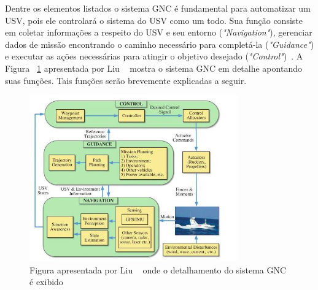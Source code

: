         Dentre os elementos listados o sistema GNC é fundamental para automatizar um USV, pois ele controlará o sistema do USV como um todo. Sua função consiste em coletar informações a respeito do USV e seu entorno (\textit{"Navigation"}), gerenciar dados de missão encontrando o caminho necessário para completá-la (\textit{"Guidance"}) e executar as ações necessárias para atingir o objetivo desejado (\textit{"Control"})~\cite{LIU201671}. A Figura ~\ref{fig:Liu2016_gncSystem} apresentada por Liu \etal~\cite{LIU201671} mostra o sistema GNC em detalhe apontando suas funções. Tais funções serão brevemente explicadas a seguir.
        
        \begin{figure}
            \centering
            \includegraphics[width=0.8\textwidth]{fig/chap2/gnc_system.png}
            \caption{Figura apresentada por Liu \etal~\cite{LIU201671} onde o detalhamento do sistema GNC é exibido}
            \label{fig:Liu2016_gncSystem}
        \end{figure}
        

